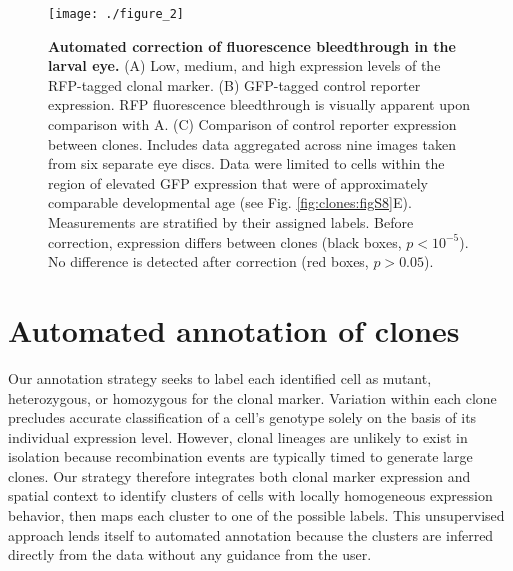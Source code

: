 \begin{figure}[t]
\centering
\texttt{[image: ./figure\_2]}
\caption[Automated correction of fluorescence bleedthrough in the larval eye.]{\textbf{Automated correction of fluorescence bleedthrough in the larval eye.} (A) Low, medium, and high expression levels of the RFP-tagged clonal marker. (B) GFP-tagged control reporter expression. RFP fluorescence bleedthrough is visually apparent upon comparison with A. (C) Comparison of control reporter expression between clones. Includes data aggregated across nine images taken from six separate eye discs. Data were limited to cells within the region of elevated GFP expression that were of approximately comparable developmental age (see Fig. \ref{fig:clones:figS8}E). Measurements are stratified by their assigned labels. Before correction, expression differs between clones (black boxes, $p<10^{-5}$). No difference is detected after correction (red boxes, $p>0.05$).}
\label{fig:clones:fig2}
\end{figure}

\section{Automated annotation of clones}
\label{ch:clones:annotation}

Our annotation strategy seeks to label each identified cell as mutant, heterozygous, or homozygous for the clonal marker. Variation within each clone precludes accurate classification of a cell's genotype solely on the basis of its individual expression level. However, clonal lineages are unlikely to exist in isolation because recombination events are typically timed to generate large clones. Our strategy therefore integrates both clonal marker expression and spatial context to identify clusters of cells with locally homogeneous expression behavior, then maps each cluster to one of the possible labels. This unsupervised approach lends itself to automated annotation because the clusters are inferred directly from the data without any guidance from the user.

